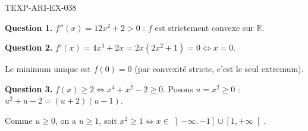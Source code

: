 \begin{corrige}{TEXP-ARI-EX-038}

\textbf{Question 1.} $f''(x) = 12x^2 + 2 > 0$ : $f$ est strictement convexe sur $\mathbb{R}$.


\textbf{Question 2.} $f'(x) = 4x^3 + 2x = 2x(2x^2+1) = 0 \iff x = 0$.

Le minimum unique est $f(0) = 0$ (par convexité stricte, c'est le seul extremum).

\textbf{Question 3.} $f(x) \geq 2 \iff x^4 + x^2 - 2 \geq 0$. Posons $u = x^2 \geq 0$ : $u^2 + u - 2 = (u+2)(u-1)$.

Comme $u \geq 0$, on a $u \geq 1$, soit $x^2 \geq 1 \iff x \in \left]-\infty, -1\right] \cup \left[1, +\infty\right[$.

\end{corrige}
